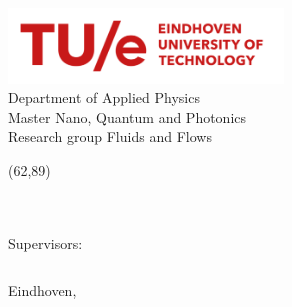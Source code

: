 \begin{center}
    \includegraphics[height=2cm]{figures/tue-logo-high}\\
    \large
    Department of Applied Physics\\
    Master Nano, Quantum and Photonics\\
    Research group Fluids and Flows
    
    \vspace*{10cm}
    
    \setlength{\TPHorizModule}{1mm}
    \setlength{\TPVertModule}{\TPHorizModule}
    \newlength{\backupparindent}
    \setlength{\backupparindent}{\parindent}
    \setlength{\parindent}{0mm}			
    \begin{textblock}{95} (62,89)
        \vspace*{1mm}
        \huge
        \textbf{\doctitle\\}
        \Large
        \vspace*{5mm}
        \textit{\docsubtitle}\\
        \vspace*{10mm}
        \Large
        \me\\
    \end{textblock}
    
    \large
    Supervisors:\\
    \begin{tabular}{rl}
    \end{tabular}
    
    \vfill
    
    \vfill
    \large
    Eindhoven, \monthYear\\
    
    \setlength{\parindent}{\backupparindent}
\end{center}